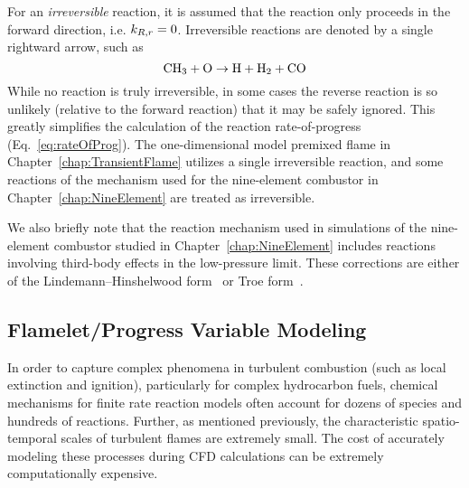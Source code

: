 For an \textit{irreversible} reaction, it is assumed that the reaction only proceeds in the forward direction, i.e. $k_{R,r} = 0$. Irreversible reactions are denoted by a single rightward arrow, such as
%
\begin{equation}
	\text{CH}_3 + \text{O} \rightarrow \text{H} + \text{H}_2 + \text{CO}
\end{equation}
%
While no reaction is truly irreversible, in some cases the reverse reaction is so unlikely (relative to the forward reaction) that it may be safely ignored. This greatly simplifies the calculation of the reaction rate-of-progress (Eq.~\ref{eq:rateOfProg}). The one-dimensional model premixed flame in Chapter~\ref{chap:TransientFlame} utilizes a single irreversible reaction, and some reactions of the mechanism used for the nine-element combustor in Chapter~\ref{chap:NineElement} are treated as irreversible.

We also briefly note that the reaction mechanism used in simulations of the nine-element combustor studied in Chapter~\ref{chap:NineElement} includes reactions involving third-body effects in the low-pressure limit. These corrections are either of the Lindemann--Hinshelwood form~\cite{Hinshelwood1926} or Troe form~\cite{Gilbert1983}.

\subsection{Flamelet/Progress Variable Modeling}\label{sec:fpv}

In order to capture complex phenomena in turbulent combustion (such as local extinction and ignition), particularly for complex hydrocarbon fuels, chemical mechanisms for finite rate reaction models often account for dozens of species and hundreds of reactions. Further, as mentioned previously, the characteristic spatio-temporal scales of turbulent flames are extremely small. The cost of accurately modeling these processes during CFD calculations can be extremely computationally expensive.

